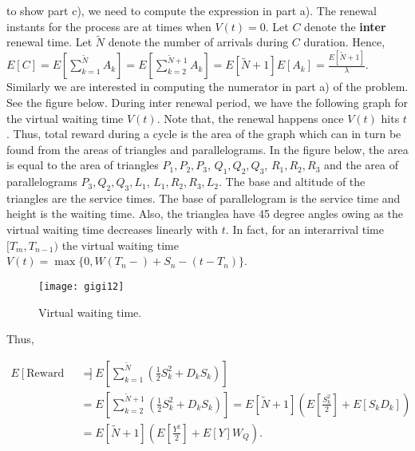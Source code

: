 \documentclass[12,a4paper,onecolumn]{article}
\begin{document}
to show part c), we need to compute the expression in part a). The renewal instants for the process are at times when $V(t)=0$. Let $C$ denote the \textbf{inter} renewal time. Let $\tilde{N}$ denote the number of arrivals during $C$ duration. Hence, $E[C]=E[\sum_{k=1}^{\tilde{N}}A_k]=E[\sum_{k=2}^{\tilde{N}+1}A_k]= E[\tilde{N}+1]E[A_k]=\frac{E[\tilde{N}+1]}{\lambda}$. Similarly we are interested in computing the numerator in part a) of  the problem. See the figure below. During inter renewal period, we have the following graph for the virtual waiting time $V(t)$. Note that, the  renewal happens once $V(t)$ hits $t$. Thus, total reward during a cycle is the area of the graph which can in turn be found from the areas of triangles and parallelograms. In the figure below, the area is equal to the area of triangles $P_1,P_2,P_3$, $Q_1,Q_2,Q_3$, $R_1,R_2,R_3$ and the area of parallelograms $P_3,Q_2,Q_3,L_1$, $L_1,R_2,R_3,L_2$. The base and altitude of the triangles are the service times. The base of parallelogram is the service time and height is the waiting time. Also, the trianglea have 45 degree angles owing as the virtual waiting time decreases linearly with $t$. In fact, for an interarrival time $[T_m,T_{n-1})$ the virtual waiting time $V(t)=\max\{0,W(T_n-)+S_n-(t-T_n)\}$.

 \begin{figure}[h]
 \hspace{40pt}
\texttt{[image: gigi12]}
\hspace{40pt}\caption{Virtual waiting time.}
 \end{figure}
 
 Thus, 
 
 \begin{align*}
E[\text{Reward during cycle}]&=E[\sum_ {k=1}^{\tilde{N}}(\frac{1}{2}S_k^2+D_kS_k)]\\
&=E[\sum_ {k=2}^{\tilde{N}+1}(\frac{1}{2}S_k^2+D_kS_k)]=E[\tilde{N}+1](E[\frac{S_k^2} {2}]+E[S_kD_k])\\
&=E[\tilde{N}+1](E[\frac{Y^2}{2}]+E[Y]W_Q).
\end{align*}
\end{document}
